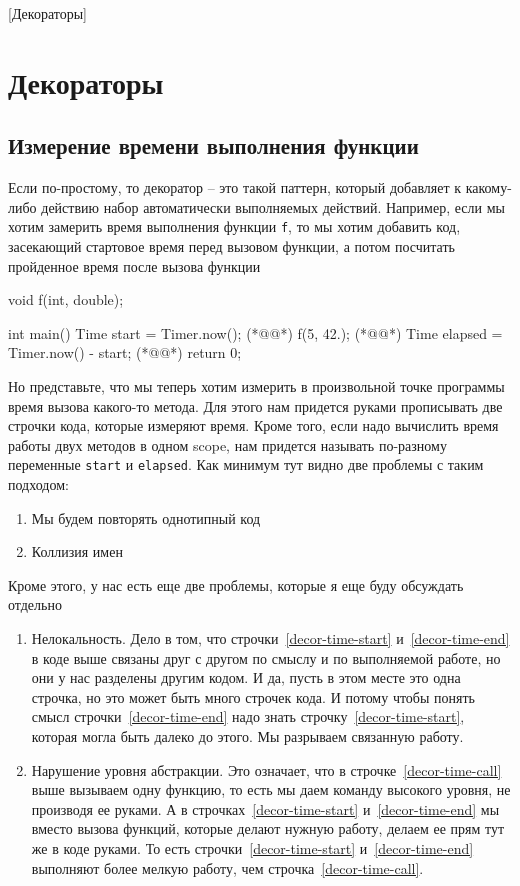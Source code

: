 [Декораторы]

\section{Декораторы}
\label{section::Decorators}

\subsection{Измерение времени выполнения функции}
\label{section::TimeEstimation}

Если по-простому, то декоратор -- это такой паттерн, который добавляет к какому-либо действию набор автоматически выполняемых действий.
Например, если мы хотим замерить время выполнения функции \verb"f", то мы хотим добавить код, засекающий стартовое время перед вызовом функции, а потом посчитать пройденное время после вызова функции
\begin{cppcode}
void f(int, double);

int main() {
  Time start = Timer.now(); (*@@*)
  f(5, 42.); (*@@*)
  Time elapsed = Timer.now() - start; (*@@*)
  return 0;
}
\end{cppcode}
Но представьте, что мы теперь хотим измерить в произвольной точке программы время вызова какого-то метода.
Для этого нам придется руками прописывать две строчки кода, которые измеряют время.
Кроме того, если надо вычислить время работы двух методов в одном scope, нам придется называть по-разному переменные \verb"start" и \verb"elapsed".
Как минимум тут видно две проблемы с таким подходом:
\begin{enumerate}
\item Мы будем повторять однотипный код

\item Коллизия имен
\end{enumerate}
Кроме этого, у нас есть еще две проблемы, которые я еще буду обсуждать отдельно
\begin{enumerate}
\item Нелокальность.
Дело в том, что строчки~\ref{decor-time-start} и~\ref{decor-time-end} в коде выше связаны друг с другом по смыслу и по выполняемой работе, но они у нас разделены другим кодом.
И да, пусть в этом месте это одна строчка, но это может быть много строчек кода.
И потому чтобы понять смысл строчки~\ref{decor-time-end} надо знать строчку~\ref{decor-time-start}, которая могла быть далеко до этого.
Мы разрываем связанную работу.

\item Нарушение уровня абстракции.
Это означает, что в строчке~\ref{decor-time-call} выше вызываем одну функцию, то есть мы даем команду высокого уровня, не производя ее руками.
А в строчках~\ref{decor-time-start} и~\ref{decor-time-end} мы вместо вызова функций, которые делают нужную работу, делаем ее прям тут же в коде руками.
То есть строчки~\ref{decor-time-start} и~\ref{decor-time-end} выполняют более мелкую работу, чем строчка~\ref{decor-time-call}.
\end{enumerate}
